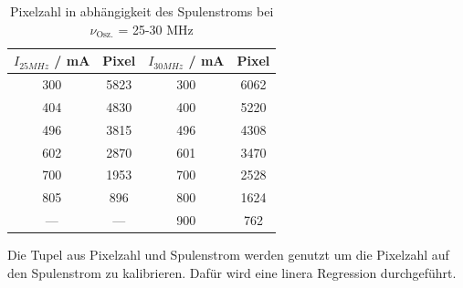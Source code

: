 \begin{table}
  \centering
  \caption{Pixelzahl in abhängigkeit des Spulenstroms bei $\nu_\text{Osz.}$ = 25-30 MHz}
  \begin{tabular}{c c|c c}
    \toprule
 	$I_{25MHz}$ / mA & Pixel & $I_{30MHz}$ / mA & Pixel \\
    \midrule
	300 & 5823 & 300 & 6062 \\
	404 & 4830 & 400 & 5220 \\
	496 & 3815 & 496 & 4308 \\
	602 & 2870 & 601 & 3470 \\
	700 & 1953 & 700 & 2528 \\
	805 & 896  & 800 & 1624 \\
	--- & ---  & 900 & 762  \\
    \bottomrule
  \end{tabular}
  \label{tab:Mess2}
\end{table}
Die Tupel aus Pixelzahl und Spulenstrom werden genutzt um die Pixelzahl auf den Spulenstrom zu kalibrieren. Dafür wird eine linera Regression durchgeführt. 
